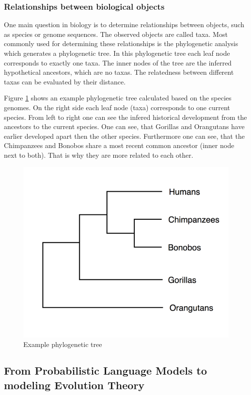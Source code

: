 \subsubsection{Relationships between biological objects} \label{fundamentalsA0d}

One main question in biology is to determine relationships between objects, such as species or genome sequences. The observed objects are called taxa. Most commonly used for determining these relationships is the phy\-lo\-ge\-ne\-tic analysis which generates a phy\-lo\-ge\-ne\-tic tree. In this phy\-lo\-ge\-ne\-tic tree each leaf node corresponds to exactly one taxa. The inner nodes of the tree are the inferred hypothetical ancestors, which are no taxas. The relatedness between different taxas can be evaluated by their distance. \cite{böckenhauer2013algorithmische}

Figure \ref{examplePhylogeneticTree} shows an example phylogenetic tree calculated based on the species genomes. On the right side each leaf node (taxa) corresponds to one current species. From left to right one can see the infered historical development from the ancestors to the current species. One can see, that Gorillas and Orangutans have earlier developed apart then the other species. Furthermore one can see, that the  Chimpanzees and Bonobos share a most recent common ancestor (inner node next to both). That is why they are more related to each other. \cite{mallawaarachchiMolecularPhylogeneticsUsing2018}

\begin{figure}[ht]
	\centering
	\includegraphics[width=0.5\linewidth]{figures/examplePhylogeneticTree.png}
	\caption{Example phylogenetic tree \cite{mallawaarachchiMolecularPhylogeneticsUsing2018}}
	\label{examplePhylogeneticTree}
\end{figure}

\newpage

\subsection{From Probabilistic Language Models to modeling Evolution Theory} \label{fundamentalsA}

